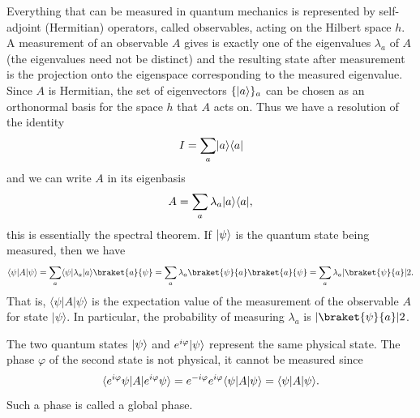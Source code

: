 \documentclass[a4paper,10pt,oneside]{book}
\theoremstyle{plain}
\theoremstyle{definition}
\theoremstyle{remark}
\DeclarePairedDelimiter\abs{\lvert}{\rvert}
\DeclarePairedDelimiter\bra{\langle}{\rvert}
\DeclarePairedDelimiter\ket{\lvert}{\rangle}
\begin{document}
Everything that can be measured in quantum mechanics is represented by self-adjoint (Hermitian) operators, called observables, acting on the Hilbert space $h$. A measurement of an observable $A$ gives is exactly one of the eigenvalues $\lambda_a$ of $A$ (the eigenvalues need not be distinct) and the resulting state after measurement is the projection onto the eigenspace corresponding to the measured eigenvalue. Since $A$ is Hermitian, the set of eigenvectors $\{\ket{a}\}_{a}$ can be chosen as an orthonormal basis for the space $h$ that $A$ acts on. Thus we have a resolution of the identity
\begin{equation}
  I = \sum_a \ket{a}\bra{a}
\end{equation}
and we can write $A$ in its eigenbasis
\begin{equation}
  A = \sum_a \lambda_a \ket{a}\bra{a},
\end{equation}
this is essentially the spectral theorem. If $\ket{\psi}$ is the quantum state being measured, then we have
\begin{equation}
  \bra{\psi}A\ket{\psi}
  = \sum_a \bra{\psi}\lambda_a \ket{a}\braket{a}{\psi}
  = \sum_a \lambda_a \braket{\psi}{a}\braket{a}{\psi}
  = \sum_a \lambda_a \abs{\braket{\psi}{a}}2.
\end{equation}
That is, $⟨ψ|A|ψ⟩$ is the expectation value of the measurement of the observable $A$ for state $|ψ⟩$. In particular, the probability of measuring $λ_a$ is $\abs{\braket{\psi}{a}}2$.

The two quantum states $\ket{\psi}$ and $e^{i\varphi}\ket{\psi}$ represent the same physical state. The phase $\varphi$ of the second state is not physical, it cannot be measured since
\begin{equation}
  \bra{e^{i\varphi}\psi}A\ket{e^{i\varphi}\psi}
  = e^{-i\varphi}e^{i\varphi} \bra{\psi}A\ket{\psi}
  = \bra{\psi}A\ket{\psi}.
\end{equation}
Such a phase is called a global phase.
\end{document}
